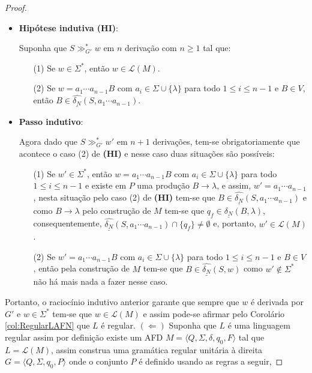\begin{proof}
\begin{itemize}
		
		\item \textbf{Hipótese indutiva (HI)}:
		
		Suponha que $S \gg^*_{G'} w$ em $n$ derivação com $n \geq 1$ tal que:
		\begin{itemize}
			\item[(1)] Se $w \in \Sigma^*$, então $w \in \mathcal{L}(M)$.
			\item[(2)] Se $w = a_1\cdots a_{n-1}B$ com $a_i \in \Sigma \cup \{\lambda\}$ para todo $1 \leq i \leq n-1$ e $B \in V$, então $B \in \widehat{\underline{\delta_N}}(S, a_1\cdots a_{n-1})$.
		\end{itemize}
		
		\item \textbf{Passo indutivo}:
		
		Agora dado que $S \gg^*_{G'} w'$ em $n+1$ derivações, tem-se obrigatoriamente que acontece o caso (2) de \textbf{(HI)} e nesse caso duas situações são possíveis:
		\begin{itemize}
			\item[(1)] Se $w' \in \Sigma^*$, então $w = a_1\cdots a_{n-1}B$ com $a_i \in \Sigma \cup \{\lambda\}$ para todo $1 \leq i \leq n-1$ e existe em $P$ uma produção $B \rightarrow \lambda$, e assim, $w' = a_1\cdots a_{n-1}$, nesta situação pelo caso (2) de \textbf{(HI)} tem-se que $B \in \widehat{\underline{\delta_N}}(S, a_1\cdots a_{n-1})$ e como $B \rightarrow \lambda$ pelo construção de $M$ tem-se que $q_f \in \underline{\delta_N}(B, \lambda)$, consequentemente, $\widehat{\underline{\delta_N}}(S, a_1\cdots a_{n-1}) \cap \{q_f\} \neq \emptyset$ e, portanto, $w' \in \mathcal{L}(M)$.
			\item[(2)] Se $w' = a_1\cdots a_{n-1}B$ com $a_i \in \Sigma \cup \{\lambda\}$ para todo $1 \leq i \leq n-1$ e $B \in V$, então pela construção de $M$ tem-se que $B \in \widehat{\underline{\delta_N}}(S, w)$ como $w' \notin \Sigma^*$ não há mais nada a fazer nesse caso.
		\end{itemize}
	\end{itemize}
	Portanto, o raciocínio indutivo anterior garante que sempre que  $w$ é derivada por $G'$ e $w \in \Sigma^*$ tem-se que $w \in \mathcal{L}(M)$ e assim pode-se afirmar pelo Corolário \ref{col:RegularLAFN} que $L$ é regular. $(\Leftarrow)$ Suponha que $L$ é uma linguagem regular assim por definição existe um AFD $M = \langle Q, \Sigma, \delta, q_0, F \rangle$ tal que $L = \mathcal{L}(M)$, assim construa uma gramática regular unitária à direita $G = \langle Q, \Sigma, q_0, P \rangle$ onde o conjunto $P$ é definido usando as regras a seguir, 

\end{proof}
